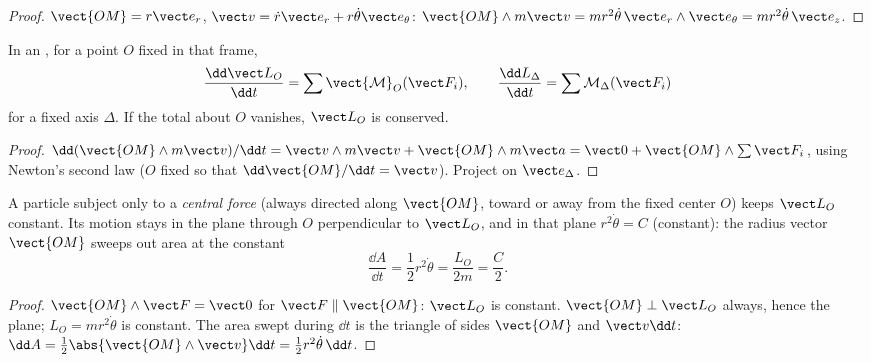 \begin{proof}
$\vect{OM} = r\vect e_r$, $\vect v = \dot r\vect e_r + r\dot\theta\vect e_\theta$:
$\vect{OM}\wedge m\vect v = mr^2\dot\theta\,\vect e_r\wedge\vect e_\theta = mr^2\dot\theta\,\vect e_z$.
\end{proof}

\begin{theorem}\label{thm:b1:angular-momentum:theorem}
In an , for a point $O$ fixed in that frame,
\[
\frac{\dd\vect L_O}{\dd t} = \sum\vect{\mathcal M}_O(\vect F_i),
\qquad
\frac{\dd L_\Delta}{\dd t} = \sum\mathcal M_\Delta(\vect F_i)
\]
for a fixed axis $\Delta$. If the total  about $O$ vanishes,
$\vect L_O$ is conserved.
\end{theorem}

\begin{proof}
$\dd(\vect{OM}\wedge m\vect v)/\dd t = \vect v\wedge m\vect v + \vect{OM}\wedge m\vect a
= \vect 0 + \vect{OM}\wedge\sum\vect F_i$, using Newton's second law
($O$ fixed so that $\dd\vect{OM}/\dd t = \vect v$). Project on $\vect e_\Delta$.
\end{proof}

\begin{corollary}\label{cor:b1:angular-momentum:central}
A particle subject only to a \emph{central force} (always directed
along $\vect{OM}$, toward or away from the fixed center $O$) keeps
$\vect L_O$ constant. Its motion stays in the plane through $O$
perpendicular to $\vect L_O$, and in that plane $r^2\dot\theta = C$
(constant): the radius vector $\vect{OM}$ sweeps out area at the
constant \emph{}
\[
\frac{\dd A}{\dd t} = \frac12 r^2\dot\theta = \frac{L_O}{2m} = \frac{C}{2} .
\]
\end{corollary}

\begin{proof}
$\vect{OM}\wedge\vect F = \vect 0$ for $\vect F \parallel \vect{OM}$: $\vect L_O$
is constant. $\vect{OM}\perp\vect L_O$ always, hence the plane; $L_O =
mr^2\dot\theta$ is constant. The area swept during $\dd t$ is the
triangle of sides $\vect{OM}$ and $\vect v\dd t$: $\dd A = \tfrac12\abs{\vect{OM}
\wedge\vect v}\dd t = \tfrac12 r^2\dot\theta\,\dd t$.
\end{proof}

